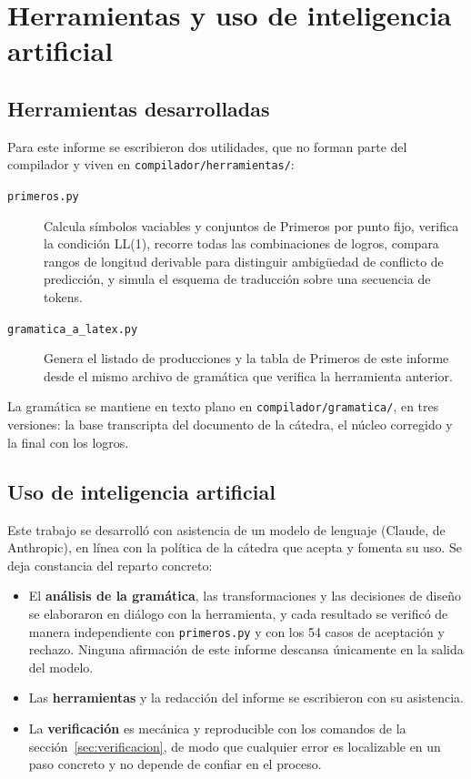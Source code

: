 \section{Herramientas y uso de inteligencia artificial}

\subsection{Herramientas desarrolladas}

Para este informe se escribieron dos utilidades, que no forman parte del compilador y viven en
\texttt{compilador/herramientas/}:

\begin{description}
  \item[\texttt{primeros.py}] Calcula símbolos vaciables y conjuntos de Primeros por punto fijo,
        verifica la condición LL(1), recorre todas las combinaciones de logros, compara
        rangos de longitud derivable para distinguir ambigüedad de conflicto de predicción, y
        simula el esquema de traducción sobre una secuencia de tokens.
  \item[\texttt{gramatica\_a\_latex.py}] Genera el listado de producciones y la tabla de Primeros
        de este informe desde el mismo archivo de gramática que verifica la herramienta anterior.
\end{description}

La gramática se mantiene en texto plano en \texttt{compilador/gramatica/}, en tres versiones: la
base transcripta del documento de la cátedra, el núcleo corregido y la final con los logros.

\subsection{Uso de inteligencia artificial}

Este trabajo se desarrolló con asistencia de un modelo de lenguaje (Claude, de Anthropic), en
línea con la política de la cátedra que acepta y fomenta su uso. Se deja constancia del reparto
concreto:

\begin{itemize}
  \item El \textbf{análisis de la gramática}, las transformaciones y las decisiones de diseño se
        elaboraron en diálogo con la herramienta, y cada resultado se verificó de manera
        independiente con \texttt{primeros.py} y con los 54 casos de aceptación y rechazo. Ninguna
        afirmación de este informe descansa únicamente en la salida del modelo.
  \item Las \textbf{herramientas} y la redacción del informe se escribieron con su asistencia.
  \item La \textbf{verificación} es mecánica y reproducible con los comandos de la
        sección~\ref{sec:verificacion}, de modo que cualquier error es localizable en un paso
        concreto y no depende de confiar en el proceso.
\end{itemize}

